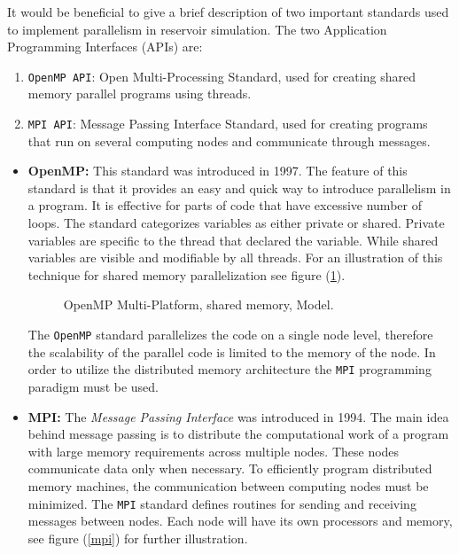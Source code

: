 \documentclass[barcolor=BrickRed,nocopyright,nolists]{asmejour}
\begin{document}
It would be beneficial to give a brief description of two important standards used to implement parallelism in reservoir simulation. The two Application Programming Interfaces (APIs) are:
\begin{enumerate}
	\item \texttt{OpenMP API}: Open Multi-Processing Standard, used for creating shared memory parallel programs using threads.
	\item \texttt{MPI API}: Message Passing Interface Standard, used for creating programs that run on several computing nodes and communicate through messages.
\end{enumerate}

\begin{itemize}
	\item \textbf{OpenMP:} This standard was introduced in 1997\cite{rz}. The feature of this standard is that it provides an easy and quick way to introduce
			       parallelism in a program. It is effective for parts of code that have excessive number of loops.
			       The standard categorizes variables as either private or shared. Private variables are specific to the thread that declared the variable.
			       While shared variables are visible and modifiable by all threads.
			       For an illustration of this technique for shared memory parallelization see figure (\ref{openmp}).
			       \begin{figure}[h]
			       		\center
			       		\caption{OpenMP Multi-Platform, shared memory, Model.}
			       		\label{openmp}
			       \end{figure}
			       The \texttt{OpenMP} standard parallelizes the code on a single node level, therefore the scalability of the parallel code is limited to the memory of the node.
			       In order to utilize the distributed memory architecture the \texttt{MPI} programming paradigm must be used.
	\item \textbf{MPI:} The \textit{Message Passing Interface} was introduced in 1994\cite{rz}. The main idea behind message passing is to distribute the computational work of a program with
			    large memory requirements across multiple nodes. These nodes communicate data only when necessary. To efficiently program distributed memory machines, the communication
			    between computing nodes must be minimized. The \texttt{MPI} standard defines routines for sending and receiving messages between nodes. Each node will have its own 
			    processors and memory, see figure (\ref{mpi}) for further illustration.

\end{itemize}
\end{document}
